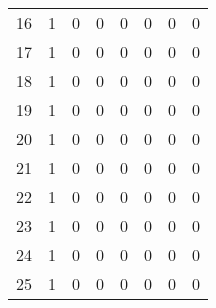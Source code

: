 \begin{table}[h]
{\begin{tabular}{|c|c|c|c|c|c|c|c|}
16 & 1 & 0 & 0 & 0 & 0 & 0 & 0 \\
17 & 1 & 0 & 0 & 0 & 0 & 0 & 0 \\
18 & 1 & 0 & 0 & 0 & 0 & 0 & 0 \\
19 & 1 & 0 & 0 & 0 & 0 & 0 & 0 \\
20 & 1 & 0 & 0 & 0 & 0 & 0 & 0 \\
21 & 1 & 0 & 0 & 0 & 0 & 0 & 0 \\
22 & 1 & 0 & 0 & 0 & 0 & 0 & 0 \\
23 & 1 & 0 & 0 & 0 & 0 & 0 & 0 \\
24 & 1 & 0 & 0 & 0 & 0 & 0 & 0 \\
25 & 1 & 0 & 0 & 0 & 0 & 0 & 0 \\ \hline
\end{tabular}%
}
\end{table}

